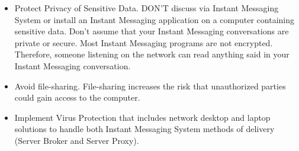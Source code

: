 \begin{itemize}
    \item Protect Privacy of Sensitive Data.
    DON'T discuss via Instant Messaging System or install an Instant Messaging application on a computer containing sensitive data.
    Don't assume that your Instant Messaging conversations are private or secure.
    Most Instant Messaging programs are not encrypted.
    Therefore, someone listening on the network can read anything said in your Instant Messaging conversation.
    \item Avoid file-sharing.
    File-sharing increases the risk that unauthorized parties could gain access to the computer.
    \item Implement Virus Protection that includes network desktop and laptop solutions to handle both Instant Messaging System
    methods of delivery (Server Broker and Server Proxy).
\end{itemize}